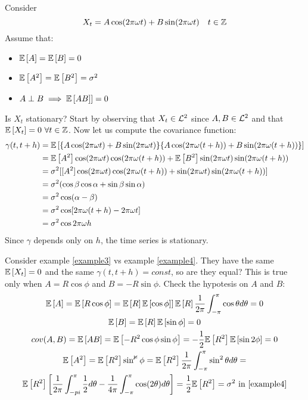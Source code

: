 \begin{example}
    \label{example4}
    Consider
    \[
        X_t=A\cos(2\pi\omega t)+B\sin(2\pi\omega t)\ \ \ t\in\Z
    \]
    Assume that:
    \begin{itemize}
        \item $\mathbb{E}\left[A\right]=\mathbb{E}\left[B\right]=0$
        \item $\mathbb{E}\left[A^2\right]=\mathbb{E}\left[B^2\right]=\sigma^2$
        \item $A\perp B \implies \mathbb{E}\left[AB]\right]=0$
    \end{itemize}
    Is $X_t$ stationary? Start by observing that $X_t\in\mathcal{L}^{2}$ since $A,B\in\mathcal{L}^{2}$ and that $\mathbb{E}\left[X_t\right]=0\ \forall t\in\mathbb{Z}$. Now let us compute the covariance function:
    \begin{equation*}
        \begin{split}
            \gamma(t,t+h)&=\mathbb{E}\left[\{A\cos(2\pi\omega t)+B\sin(2\pi\omega t)\}\{A\cos(2\pi\omega(t+h))+B\sin(2\pi\omega(t+h))\}\right]\\
            &=\mathbb{E}\left[A^2\right]\cos(2\pi\omega t)\cos(2\pi\omega(t+h))+\mathbb{E}\left[B^2\right]\sin(2\pi\omega t)\sin(2\pi\omega(t+h))\\
            &=\sigma^2[[A^2]\cos(2\pi\omega t)\cos(2\pi\omega(t+h))+\sin(2\pi\omega t)\sin(2\pi\omega(t+h))]\\
            &=\sigma^2(\cos\beta\cos\alpha+\sin\beta\sin\alpha)\\
            &=\sigma^2\cos(\alpha-\beta)\\
            &=\sigma^2\cos[2\pi\omega(t+h)-2\pi\omega t]\\
            &=\sigma^2\cos2\pi\omega h
        \end{split} 
    \end{equation*}
    Since $\gamma$ depends only on $h$, the time series is stationary.
\end{example}

\begin{remark}
    Consider example \ref{example3} vs example \ref{example4}. They have the same $\mathbb{E}\left[X_t\right]=0$ and the same $\gamma(t,t+h)=const$, so are they equal? This is true only when $A=R\cos\phi$ and $B=-R\sin\phi$. Check the hypotesis on $A$ and $B$:
    \begin{multline*}
        \mathbb{E}\left[A\right]=\mathbb{E}\left[R\cos\phi\right]=\mathbb{E}\left[R\right]\mathbb{E}\left[\cos\phi]\right]\mathbb{E}\left[R\right]\frac{1}{2\pi}\int_{-\pi}^\pi\cos\theta d\theta=0\\
        \mathbb{E}\left[B\right]=\mathbb{E}\left[R\right]\mathbb{E}\left[\sin\phi\right]=0\\
        cov(A,B)=\mathbb{E}\left[AB\right]=\mathbb{E}\left[-R^2\cos\phi\sin\phi\right]=-\frac{1}{2}\mathbb{E}\left[R^2\right]\mathbb{E}\left[\sin2\phi\right]=0\\
        \mathbb{E}\left[A^2\right]=\mathbb{E}\left[R^2\right]\mathbb{\sin^2\phi}=\mathbb{E}\left[R^2\right]\frac{1}{2\pi}\int_{-\pi}^\pi\sin^2\theta d\theta=\\\mathbb{E}\left[R^2\right]\left[\frac{1}{2\pi}\int_{-pi}^\pi\frac{1}{2}d\theta-\frac{1}{4\pi}\int_{-\pi}^\pi\cos(2\theta)d\theta\right]=\frac{1}{2}\mathbb{E}\left[R^2\right]=\sigma^2 \text{ in \ref{example4}}
    \end{multline*}
\end{remark}

